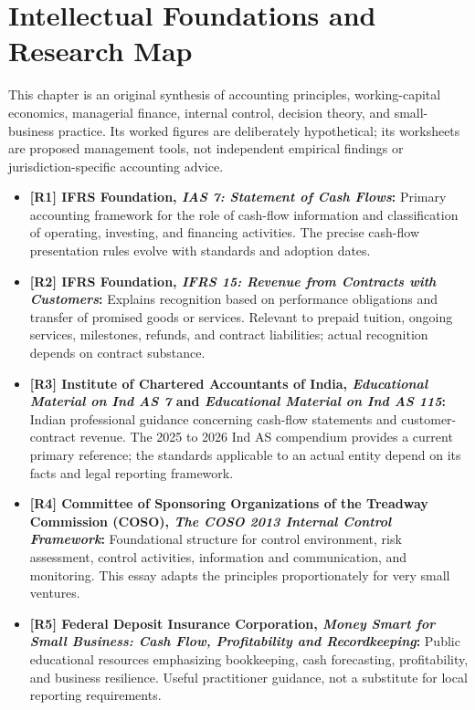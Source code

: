 \section*{Intellectual Foundations and Research Map}

This chapter is an original synthesis of accounting principles, working-capital economics, managerial finance, internal control, decision theory, and small-business practice. Its worked figures are deliberately hypothetical; its worksheets are proposed management tools, not independent empirical findings or jurisdiction-specific accounting advice.

\begin{itemize}
\item \textbf{[R1] IFRS Foundation, \emph{IAS 7: Statement of Cash Flows}:} Primary accounting framework for the role of cash-flow information and classification of operating, investing, and financing activities. The precise cash-flow presentation rules evolve with standards and adoption dates.

\item \textbf{[R2] IFRS Foundation, \emph{IFRS 15: Revenue from Contracts with Customers}:} Explains recognition based on performance obligations and transfer of promised goods or services. Relevant to prepaid tuition, ongoing services, milestones, refunds, and contract liabilities; actual recognition depends on contract substance.

\item \textbf{[R3] Institute of Chartered Accountants of India, \emph{Educational Material on Ind AS 7} and \emph{Educational Material on Ind AS 115}:} Indian professional guidance concerning cash-flow statements and customer-contract revenue. The 2025 to 2026 Ind AS compendium provides a current primary reference; the standards applicable to an actual entity depend on its facts and legal reporting framework.

\item \textbf{[R4] Committee of Sponsoring Organizations of the Treadway Commission (COSO), \emph{The COSO 2013 Internal Control Framework}:} Foundational structure for control environment, risk assessment, control activities, information and communication, and monitoring. This essay adapts the principles proportionately for very small ventures.

\item \textbf{[R5] Federal Deposit Insurance Corporation, \emph{Money Smart for Small Business: Cash Flow, Profitability and Recordkeeping}:} Public educational resources emphasizing bookkeeping, cash forecasting, profitability, and business resilience. Useful practitioner guidance, not a substitute for local reporting requirements.


\end{itemize}
